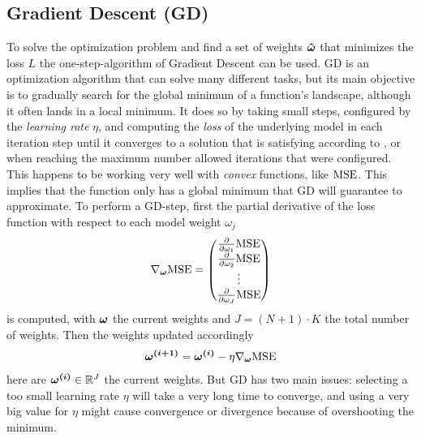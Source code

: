 \subsection{Gradient Descent (GD)}\label{subsec:gd}
To solve the optimization problem and find a set of weights $\bm{\hat{\omega}}$ that minimizes the loss $L$ the one-step-algorithm of Gradient Descent can be used.
GD is an optimization algorithm that can solve many different tasks, but its main objective is to gradually search for the global minimum of a function's landscape, although it often lands in a local minimum.
It does so by taking small steps, configured by the \textit{learning rate} $\eta$, and computing the \textit{loss} of the underlying model in each iteration step until it converges to a solution that is satisfying according to , or when reaching the maximum number allowed iterations that were configured.
This happens to be working very well with \textit{convex} functions, like $\text{MSE}$.
This implies that the function only has a global minimum that GD will guarantee to approximate.
To perform a GD-step, first the partial derivative of the loss function with respect to each model weight $\omega_j$
\begin{align}
    \nabla_{\bm{\omega}} \text{MSE} =
    \begin{pmatrix}
        \frac{\partial }{\partial \omega_1}\text{MSE}\\
        \frac{\partial }{\partial \omega_2}\text{MSE}\\
        \vdots\\
        \frac{\partial }{\partial \omega_J}\text{MSE}
    \end{pmatrix}
\end{align}
is computed, with $\bm{\omega}$ the current weights and $J=(N+1)\cdot K$ the total number of weights.
Then the weights updated accordingly
\begin{align}
    \bm{\omega^{(i+1)}}  = \bm{\omega^{(i)}} - \eta \nabla_{\bm{\omega}}\text{MSE}
    \label{eq:gd-step}
\end{align}
here are $\bm{\omega^{(i)}}\in \mathbb{R}^{J}$ the current weights.
But GD has two main issues: selecting a too small learning rate $\eta$ will take a very long time to converge, and using a very big value for $\eta$ might cause convergence or divergence because of overshooting the minimum.
